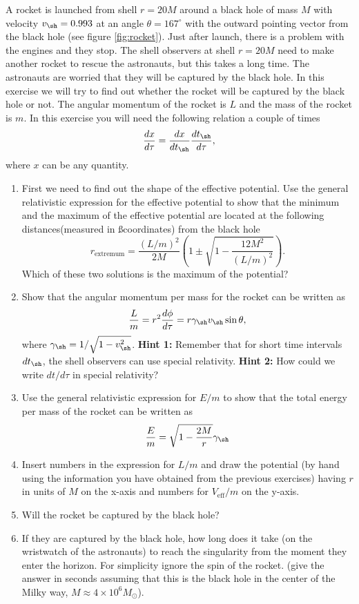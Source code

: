 \begin{multicols}{2}
A rocket is launched from shell $r=20M$ around a black hole of mass $M$ with velocity $v_\sh=0.993$ at an angle $\theta=167^\circ$ with the outward pointing vector from the black hole (see figure \ref{fig:rocket}). Just after launch, there is a problem with the engines and they stop. The shell observers at shell $r=20M$ need to make another rocket to rescue the astronauts, but this takes a long time. The astronauts are worried that they will be captured by the black hole. In this exercise we will try to find out whether the rocket will be captured by the black hole or not. The angular momentum of the rocket is $L$ and the mass of the rocket is $m$. In this exercise you will need the following relation a couple of times
\[
\frac{dx}{d\tau}=\frac{dx}{dt_\sh}\frac{dt_\sh}{d\tau},
\]
where $x$ can be any quantity.
\begin{enumerate}
\item First we need to find out the shape of the effective potential. Use the general relativistic expression for the effective potential to show that the minimum and the maximum of the effective potential are located at the following distances(measured in \ss coordinates) from the black hole
\[
r_\mathrm{extremum}=\frac{(L/m)^2}{2M}\left(1\pm\sqrt{1-\frac{12M^2}{(L/m)^2}}\right).
\]
Which of these two solutions is the maximum of the potential?
\item Show that the angular momentum per mass for the rocket can be written as
\[
\frac{L}{m}=r^2\frac{d\phi}{d\tau}=r\gamma_\sh v_\sh \sin\theta,
\]
where $\gamma_\sh=1/\sqrt{1-v_\sh^2}$.
{\bf Hint 1:} Remember that for short time intervals $dt_\sh$, the shell observers can use special relativity. {\bf Hint 2:} How could we write $dt/d\tau$ in special relativity?
\item Use the general relativistic expression for $E/m$ to show that the total energy per mass of the rocket can be written as
\[
\frac{E}{m}=\sqrt{1-\frac{2M}{r}}\gamma_\sh
\]
\item Insert numbers in the expression for $L/m$ and draw the potential (by hand using the information you have obtained from the previous exercises) having $r$ in units of $M$ on the x-axis and numbers for $V_\mathrm{eff}/m$ on the y-axis.
\item Will the rocket be captured by the black hole?
\item If they are captured by the black hole, how long does it take (on the wristwatch of the astronauts) to reach the singularity from the moment they enter the horizon. For simplicity ignore the spin of the rocket. (give the answer in seconds assuming that this is the black hole in the center of the Milky way, $M\approx4\times10^6M_\odot$). 


\end{enumerate}
\end{multicols}
